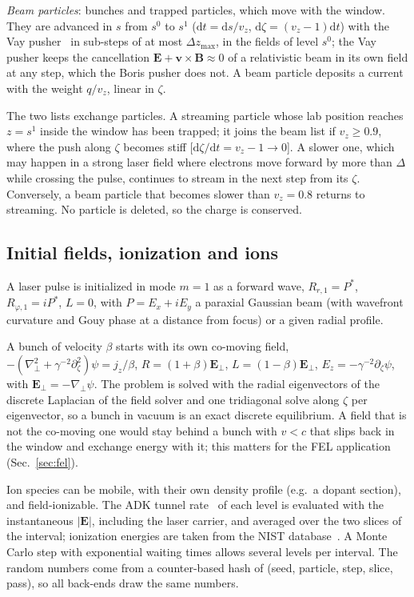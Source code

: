 \documentclass[aps,prab,reprint,floatfix,superscriptaddress,amsmath,amssymb]{revtex4-2}
\newcommand{\dd}{\mathrm{d}}
\begin{document}
\emph{Beam particles}: bunches and trapped particles, which move with the window. They are advanced in $s$ from $s^0$ to $s^1$ ($\dd t = \dd s/v_z$, $\dd\zeta = (v_z - 1)\dd t$) with the Vay pusher~\cite{Vay2008} in sub-steps of at most $\Delta z_\mathrm{max}$, in the fields of level $s^0$; the Vay pusher keeps the cancellation $\bm E + \bm v\times\bm B \approx 0$ of a relativistic beam in its own field at any step, which the Boris pusher does not. A beam particle deposits a current with the weight $q/v_z$, linear in $\zeta$.

The two lists exchange particles. A streaming particle whose lab position reaches $z = s^1$ inside the window has been trapped; it joins the beam list if $v_z \ge 0.9$, where the push along $\zeta$ becomes stiff [$\dd\zeta/\dd t = v_z - 1 \to 0$]. A slower one, which may happen in a strong laser field where electrons move forward by more than $\Delta$ while crossing the pulse, continues to stream in the next step from its $\zeta$. Conversely, a beam particle that becomes slower than $v_z = 0.8$ returns to streaming. No particle is deleted, so the charge is conserved.

\subsection{Initial fields, ionization and ions}

A laser pulse is initialized in mode $m=1$ as a forward wave, $R_{r,1} = P^*$, $R_{\varphi,1} = iP^*$, $L = 0$, with $P = E_x + iE_y$ a paraxial Gaussian beam (with wavefront curvature and Gouy phase at a distance from focus) or a given radial profile.

A bunch of velocity $\beta$ starts with its own co-moving field, $-(\nabla_\perp^2 + \gamma^{-2}\partial_\zeta^2)\psi = j_z/\beta$, $R = (1 + \beta)\bm E_\perp$, $L = (1-\beta)\bm E_\perp$, $E_z = -\gamma^{-2}\partial_\zeta\psi$, with $\bm E_\perp = -\nabla_\perp\psi$. The problem is solved with the radial eigenvectors of the discrete Laplacian of the field solver and one tridiagonal solve along $\zeta$ per eigenvector, so a bunch in vacuum is an exact discrete equilibrium. A field that is not the co-moving one would stay behind a bunch with $v < c$ that slips back in the window and exchange energy with it; this matters for the FEL application (Sec.~\ref{sec:fel}).

Ion species can be mobile, with their own density profile (e.g.\ a dopant section), and field-ionizable. The ADK tunnel rate~\cite{ADK1986,Chen2013} of each level is evaluated with the instantaneous $|\bm E|$, including the laser carrier, and averaged over the two slices of the interval; ionization energies are taken from the NIST database~\cite{NIST}. A Monte Carlo step with exponential waiting times allows several levels per interval. The random numbers come from a counter-based hash of (seed, particle, step, slice, pass), so all back-ends draw the same numbers.
\end{document}
